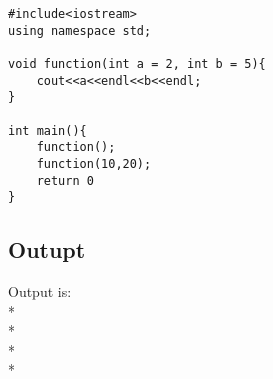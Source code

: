 \begin{lstlisting}
#include<iostream>
using namespace std;

void function(int a = 2, int b = 5){
	cout<<a<<endl<<b<<endl;
}

int main(){
	function();
	function(10,20);
	return 0
}

\end{lstlisting}
\subsection{Outupt}
Output is:  
\\* 
\\* 
\\* 
\\* 

